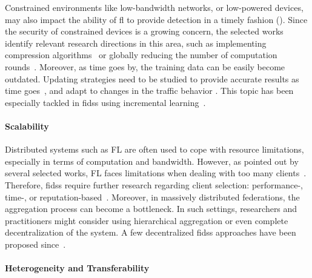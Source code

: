 Constrained environments like low-bandwidth networks, or low-powered devices, may also impact the ability of \gls{fl} to provide detection in a timely fashion ().
Since the security of constrained devices is a growing concern, the selected works identify relevant research directions in this area, such as implementing compression algorithms~\cite{fan_IoTDefenderFederatedTransfer_2020} or globally reducing the number of computation rounds~\cite{rahman_InternetThingsIntrusion_2020}.
Moreover, as time goes by, the training data can be easily become outdated.
Updating strategies need to be studied to provide accurate results as time goes~\cite{fan_IoTDefenderFederatedTransfer_2020}, and adapt to changes in the traffic behavior \cite{qin_FederatedLearningBasedNetwork_2021}.
This topic has been especially tackled in \glspl{fids} using incremental learning~\cite{jin_FederatedIncrementalLearning_2023}.


\paragraph{Scalability}

Distributed systems such as FL are often used to cope with resource limitations, especially in terms of computation and bandwidth.
However, as pointed out by several selected works, FL faces limitations when dealing with too many clients~\cite{rathore_BlockSecIoTNetBlockchainbaseddecentralized_2019,fan_IoTDefenderFederatedTransfer_2020}.
Therefore, \glspl{fids} require further research regarding client selection: performance-, time-, or reputation-based~\cite{cunhaneto_FedSBSFederatedLearningparticipantselection_2024}.
Moreover, in massively distributed federations, the aggregation process can become a bottleneck.
In such settings, researchers and practitioners might consider using hierarchical aggregation or even complete decentralization of the system.
A few decentralized \glspl{fids} approaches have been proposed since~\cite{friha_2DFIDSDecentralizeddifferentially_2023}.


\paragraph{Heterogeneity and Transferability}

